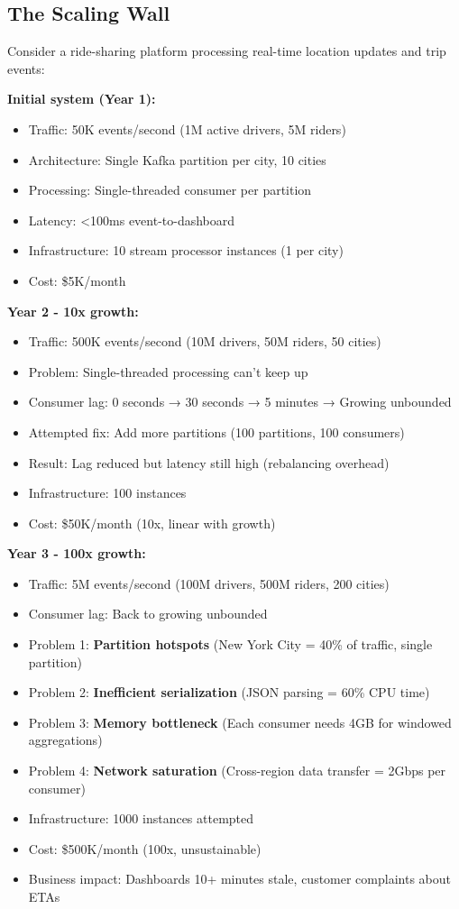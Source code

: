 \subsection{The Scaling Wall}

Consider a ride-sharing platform processing real-time location updates and trip events:

\textbf{Initial system (Year 1):}
\begin{itemize}
    \item Traffic: 50K events/second (1M active drivers, 5M riders)
    \item Architecture: Single Kafka partition per city, 10 cities
    \item Processing: Single-threaded consumer per partition
    \item Latency: <100ms event-to-dashboard
    \item Infrastructure: 10 stream processor instances (1 per city)
    \item Cost: \$5K/month
\end{itemize}

\textbf{Year 2 - 10x growth:}
\begin{itemize}
    \item Traffic: 500K events/second (10M drivers, 50M riders, 50 cities)
    \item Problem: Single-threaded processing can't keep up
    \item Consumer lag: 0 seconds → 30 seconds → 5 minutes → Growing unbounded
    \item Attempted fix: Add more partitions (100 partitions, 100 consumers)
    \item Result: Lag reduced but latency still high (rebalancing overhead)
    \item Infrastructure: 100 instances
    \item Cost: \$50K/month (10x, linear with growth)
\end{itemize}

\textbf{Year 3 - 100x growth:}
\begin{itemize}
    \item Traffic: 5M events/second (100M drivers, 500M riders, 200 cities)
    \item Consumer lag: Back to growing unbounded
    \item Problem 1: \textbf{Partition hotspots} (New York City = 40\% of traffic, single partition)
    \item Problem 2: \textbf{Inefficient serialization} (JSON parsing = 60\% CPU time)
    \item Problem 3: \textbf{Memory bottleneck} (Each consumer needs 4GB for windowed aggregations)
    \item Problem 4: \textbf{Network saturation} (Cross-region data transfer = 2Gbps per consumer)
    \item Infrastructure: 1000 instances attempted
    \item Cost: \$500K/month (100x, unsustainable)
    \item Business impact: Dashboards 10+ minutes stale, customer complaints about ETAs
\end{itemize}

